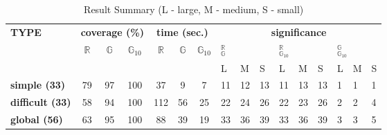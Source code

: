 \documentclass[sigconf,review]{acmart}
\newcommand{\Random}{\mathbb{R}}
\newcommand{\Genetic}{\mathbb{G}}
\newcommand{\RGenetic}{\mathbb{G}_{10}}
\begin{document}
\begin{table}[!t]
  \caption{Result Summary (L - large, M - medium, S - small)}
  \label{tbl.stats.sum}
    \footnotesize
    \begin{tabular}{l|ccc|ccc|p{3mm}p{3mm}p{3mm}|p{3mm}p{3mm}p{3mm}|p{3mm}p{3mm}p{3mm}}
      \toprule
      \multirow{3}{*}{\textbf{TYPE}} &  \multicolumn{3}{c|}{\textbf{coverage (\%)}} & \multicolumn{3}{c|}{\textbf{time (sec.)}} & \multicolumn{9}{c}{\textbf{significance}}\\
      \cline{2-16}
                                     & \multirow{2}{*}{$\Random$}  & \multirow{2}{*}{$\Genetic$} & \multirow{2}{*}{$\RGenetic$} & \multirow{2}{*}{$\Random$}  & \multirow{2}{*}{$\Genetic$} & \multirow{2}{*}{$\RGenetic$} & \multicolumn{3}{p{1cm}|}{\hfil $_{\Genetic}^{\Random}$} & \multicolumn{3}{p{1cm}|}{\hfil $_{\RGenetic}^{\Random}$} & \multicolumn{3}{p{1cm}}{\hfil $_{\RGenetic}^{\Genetic}$} \\
      \cline{8-16}
                         & & & & & &                     & L  & M  & S  & L  & M  & S  & L & M & S \\
      \midrule
      \textbf{simple (33)}    & 79 & 97 & 100 & 37  & 9  & 7  & 11 & 12 & 13 & 11 & 13 & 13 & 1 & 1 & 1 \\
      \textbf{difficult (33)} & 58 & 94 & 100 & 112 & 56 & 25 & 22 & 24 & 26 & 22 & 23 & 26 & 2 & 2 & 4 \\
      \midrule
      \textbf{global (56)}    & 63 & 95 & 100 & 88  & 39 & 19 & 33 & 36 & 39 & 33 & 36 & 39 & 3 & 3 & 5 \\
      \bottomrule
    \end{tabular}
\end{table}
\end{document}
